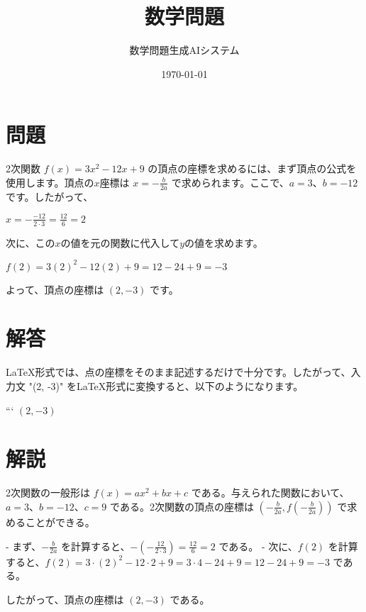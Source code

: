 \documentclass[a4paper,11pt]{article}
\title{数学問題}
\author{数学問題生成AIシステム}
\date{\today}
\numberwithin{equation}{section}
\theoremstyle{definition}
\theoremstyle{remark}
\begin{document}
\maketitle

\section*{問題}

2次関数 $f(x) = 3x^2 - 12x + 9$ の頂点の座標を求めるには、まず頂点の公式を使用します。頂点の$x$座標は $x = -\frac{b}{2a}$ で求められます。ここで、$a = 3$、$b = -12$ です。したがって、

$x = -\frac{-12}{2 \cdot 3} = \frac{12}{6} = 2$

次に、この$x$の値を元の関数に代入して$y$の値を求めます。

$f(2) = 3(2)^2 - 12(2) + 9 = 12 - 24 + 9 = -3$

よって、頂点の座標は $(2, -3)$ です。


\section*{解答}

LaTeX形式では、点の座標をそのまま記述するだけで十分です。したがって、入力文 "(2, -3)" をLaTeX形式に変換すると、以下のようになります。

```
$(2, -3)$

\section*{解説}

2次関数の一般形は $f(x) = ax^2 + bx + c$ である。与えられた関数において、$a = 3$、$b = -12$、$c = 9$ である。2次関数の頂点の座標は $\left(-\frac{b}{2a}, f\left(-\frac{b}{2a}\right)\right)$ で求めることができる。

- まず、$-\frac{b}{2a}$ を計算すると、$-\left(-\frac{12}{2\cdot 3}\right) = \frac{12}{6} = 2$ である。
- 次に、$f(2)$ を計算すると、$f(2) = 3\cdot(2)^2 - 12\cdot 2 + 9 = 3\cdot 4 - 24 + 9 = 12 - 24 + 9 = -3$ である。

したがって、頂点の座標は $(2, -3)$ である。
\end{document}

